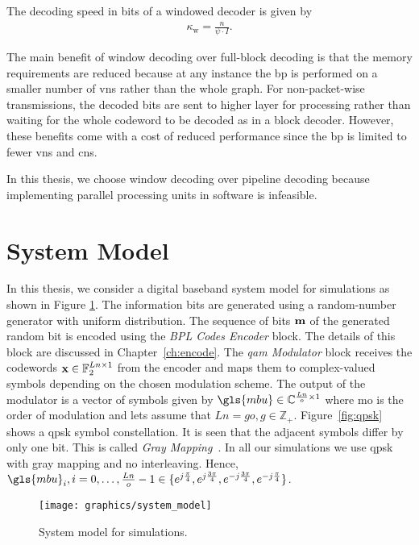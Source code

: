 The decoding speed in bits of a windowed decoder is given by
\begin{align}
\kappa_{\text{w}}=\frac{n}{\psi\cdot I}.
\end{align}

The main benefit of window decoding over full-block decoding is that the memory requirements are reduced because at any instance the \gls{bp} is performed on a smaller number of \glspl{vn} rather than the whole graph. For non-packet-wise transmissions, the decoded bits are sent to higher layer for processing rather than waiting for the whole codeword to be decoded as in a block decoder. However, these benefits come with a cost of reduced performance since the \gls{bp} is limited to fewer \glspl{vn} and \glspl{cn}.

In this thesis, we choose window decoding over pipeline decoding because implementing parallel processing units in software is infeasible.

\section{System Model}\label{sec:sys_mod}
In this thesis, we consider a digital baseband system model for simulations as shown in Figure \ref{fig:system}. The information bits are generated using a random-number generator with uniform distribution. The sequence of bits $\mathbf{m}$ of the generated random bit is encoded using the \emph{BPL Codes Encoder} block. The details of this block are discussed in Chapter~\ref{ch:encode}. The \emph{\gls{qam} Modulator} block receives the codewords $\mathbf{x}\in\mathbb{F}_2^{Ln\times 1}$ from the encoder and maps them to complex-valued symbols depending on the chosen modulation scheme. The output of the modulator is a vector of symbols given by $\gls{mbu}\in\mathbb{C}^{\frac{Ln}{o}\times 1}$ where \gls{mo} is the order of modulation and lets assume that $Ln=go, g\in\mathbb{Z}_+$. Figure~\ref{fig:qpsk} shows a \gls{qpsk} symbol constellation. It is seen that the adjacent symbols differ by only one bit. This is called \emph{Gray Mapping}~\cite{proak}. In all our simulations we use \gls{qpsk} with gray mapping and no interleaving. Hence, $\gls{mbu}_i,i=0,\dots,\frac{Ln}{o}-1\in\{e^{j\frac{\pi}{4}},e^{j\frac{3\pi}{4}},e^{-j\frac{3\pi}{4}},e^{-j\frac{\pi}{4}}\}$.
\begin{figure}[htbp]
  \centering
  \texttt{[image: graphics/system\_model]}
  \caption{System model for simulations.}
  \label{fig:system}
\end{figure}


